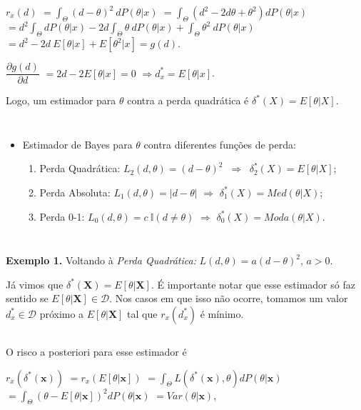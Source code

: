 \documentclass[
]{book}
\begin{document}
\(r_x(d)\) \(=\displaystyle \int_\Theta(d-\theta)^2~dP(\theta|x)\)
\(=\displaystyle \int_\Theta \left(d^2 - 2d\theta + \theta^2\right) dP(\theta|x)\) \(=d^2\displaystyle\int_\Theta dP(\theta|x) - 2d\int_\Theta\theta ~dP(\theta|x) + \int_\Theta \theta^2 ~dP(\theta|x)\) \(=d^2-2d~E[\theta|x]+E[\theta^2|x]=g(d)\).

\(\dfrac{\partial g(d)}{\partial d}\) \(=2d-2E[\theta|x]=0\) \(\Rightarrow {d}_x^*=E[\theta|x]\).

Logo, um estimador para \(\theta\) contra a perda quadrática é \({\delta}^*(X)=E[\theta|X]\).

\(~\)

\(~\)

\begin{itemize}
\item
  Estimador de Bayes para \(\theta\) contra diferentes funções de perda:

  \begin{enumerate}
  \def\labelenumi{\arabic{enumi}.}
  \item
    Perda Quadrática: \(L_2(d,\theta)=(d-\theta)^2\) \(~\Longrightarrow~\) \({\delta}_2^*(X)=E[\theta|X]\);
  \item
    Perda Absoluta: \(L_1(d,\theta)=|d-\theta|\) \(\Longrightarrow\) \({\delta}_1^*(X)=Med(\theta|X)\);
  \item
    Perda 0-1: \(L_0(d,\theta)=c~\mathbb{I}(d\neq\theta)\) \(\Longrightarrow\) \({\delta}_0^*(X)=Moda(\theta|X)\).
  \end{enumerate}
\end{itemize}

\(~\)

\(~\)

\textbf{Exemplo 1.} Voltando à \emph{Perda Quadrática:} \(L(d,\theta)=a(d-\theta)^2\), \(a>0\).

Já vimos que \(\delta^*(\boldsymbol X)=E[\theta|\boldsymbol X]\). É importante notar que esse estimador só faz sentido se \(E[\theta|\boldsymbol X]\in \mathcal{D}\). Nos casos em que isso não ocorre, tomamos um valor \({d}_x^* \in \mathcal{D}\) próximo a \(E[\theta|\boldsymbol X]\) tal que \(r_x\left({d}_x^*\right)\) é mínimo.

\(~\)

O risco a posteriori para esse estimador é

\(r_x\left(\delta^*(\boldsymbol x)\right)\) \(=r_x\left(E[\theta|\boldsymbol x]\right)\) \(=\displaystyle \int_\Theta L\left(\delta^*(\boldsymbol x),\theta\right)dP(\theta|\boldsymbol x)\) \(=\displaystyle \int_\Theta \left(\theta-E[\theta|\boldsymbol x]\right)^2 dP(\theta|\boldsymbol x)\) \(=Var(\theta|\boldsymbol x)\),
\end{document}
